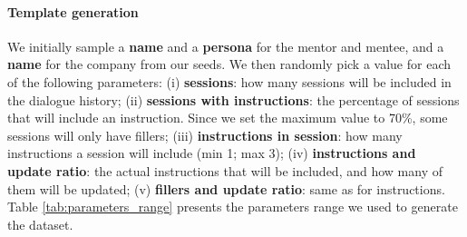 \paragraph{Template generation}  
We initially sample a \textbf{name} and a \textbf{persona} for the mentor and mentee, and a \textbf{name} for the company from our seeds. 
We then randomly pick a value for each of the following parameters: 
(i) \textbf{sessions}: how many sessions will be included in the dialogue history;
(ii) \textbf{sessions with instructions}: the percentage of sessions that will include an instruction. Since we set the maximum value to 70\%, some sessions will only have fillers;
(iii) \textbf{instructions in session}: how many instructions a session will include (min 1; max 3);
(iv) \textbf{instructions and update ratio}: the actual instructions that will be included, and how many of them will be updated;
(v) \textbf{fillers and update ratio}: same as for instructions.
Table \ref{tab:parameters_range} presents the parameters range we used to generate the dataset. 




